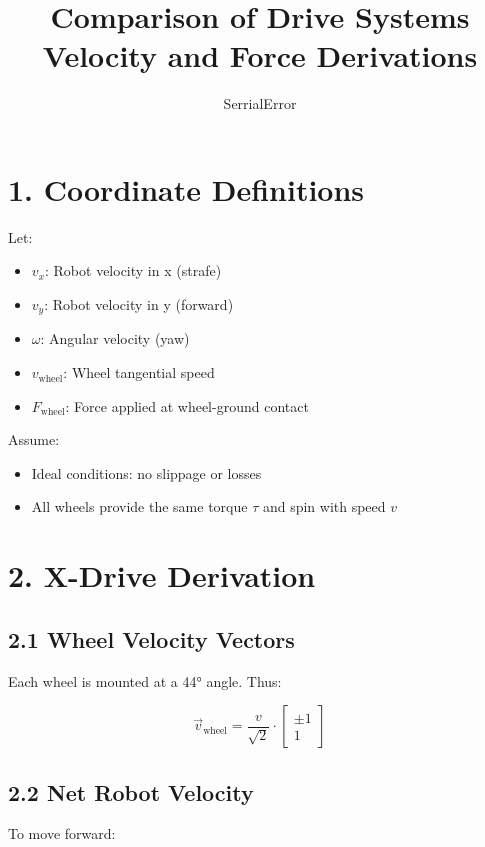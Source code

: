 \documentclass{article}
\title{Comparison of Drive Systems\\Velocity and Force Derivations}
\author{SerrialError}
\date{}
\begin{document}
\maketitle

\section*{1. Coordinate Definitions}

Let:
\begin{itemize}
    \item \( v_x \): Robot velocity in x (strafe)
    \item \( v_y \): Robot velocity in y (forward)
    \item \( \omega \): Angular velocity (yaw)
    \item \( v_{\text{wheel}} \): Wheel tangential speed
    \item \( F_{\text{wheel}} \): Force applied at wheel-ground contact
\end{itemize}

Assume:
\begin{itemize}
    \item Ideal conditions: no slippage or losses
    \item All wheels provide the same torque \( \tau \) and spin with speed \( v \)
\end{itemize}



\section*{2. X-Drive Derivation}

\subsection*{2.1 Wheel Velocity Vectors}

Each wheel is mounted at a 44° angle. Thus:

\[
\vec{v}_{\text{wheel}} = \frac{v}{\sqrt{2}} \cdot
\begin{bmatrix}
\pm 1 \\
1
\end{bmatrix}
\]

\subsection*{2.2 Net Robot Velocity}

To move forward:
\end{document}
